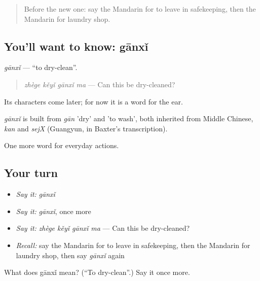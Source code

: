 \begin{quote}
Before the new one: say the Mandarin for to leave in safekeeping, then the Mandarin for laundry shop.
\end{quote}

\subsection*{You'll want to know: gānxǐ}
\emph{gānxǐ} — \textquotedblleft{}to dry-clean\textquotedblright{}.

\begin{quote}
\emph{zhège kěyǐ gānxǐ ma} — Can this be dry-cleaned?
\end{quote}

Its characters come later; for now it is a word for the ear.

\begin{cousinweb}
\emph{gānxǐ} is built from \emph{gān} 'dry' and  'to wash', both inherited from Middle Chinese, \emph{kan} and \emph{sejX} (Guangyun, in Baxter's transcription).
\end{cousinweb}

\begin{grammarlens}[title={What you've built}]
One more word for everyday actions.
\end{grammarlens}

\subsection*{Your turn}
\begin{itemize}
\raggedright
  \item \emph{Say it:} \emph{gānxǐ}
  \item \emph{Say it:} \emph{gānxǐ}, once more
  \item \emph{Say it:} \emph{zhège kěyǐ gānxǐ ma} — Can this be dry-cleaned?
  \item \emph{Recall:} say the Mandarin for to leave in safekeeping, then the Mandarin for laundry shop, then say \emph{gānxǐ} again
\end{itemize}

\begin{tcolorbox}[breakable,colback=teal!4,colframe=teal!35!black,title={Before you move on}]
What does gānxǐ mean? (\textquotedblleft{}To dry-clean\textquotedblright{}.) Say it once more.
\end{tcolorbox}
